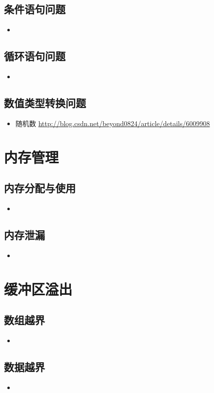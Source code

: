 \documentclass[UTF8,a4paper,12pt]{ctexbook} %
\begin{document}
		\subsection{条件语句问题}
			\begin{itemize}
				\item 
			\end{itemize}
		\subsection{循环语句问题}
			\begin{itemize}
				\item 
			\end{itemize}
		\subsection{数值类型转换问题}
			\begin{itemize}
				\item 随机数 \url{http://blog.csdn.net/beyond0824/article/details/6009908}
			\end{itemize}
\section{内存管理}
		\subsection{内存分配与使用}
			\begin{itemize}
				\item 
			\end{itemize}
		\subsection{内存泄漏}
			\begin{itemize}
				\item 
			\end{itemize}
\section{缓冲区溢出}
		\subsection{数组越界}
			\begin{itemize}
				\item 
			\end{itemize}
		\subsection{数据越界}
			\begin{itemize}
				\item 
			\end{itemize}
\end{document}
